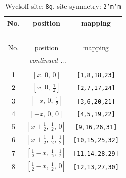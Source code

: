 \documentclass[fleqn,8pt]{jsarticle}
\begin{document}
\begin{longtable}{ccc}
\caption{Wyckoff site: {\tt 8g}, site symmetry: {\tt 2'm'm}}
 \\
 \hline \hline
No. & position & mapping \\ \hline \endfirsthead

\multicolumn{2}{l}{\tablename\ \thetable{}} \\
 \hline \hline
No. & position & mapping \\ \hline \endhead

 \hline \hline
\multicolumn{2}{r}{\footnotesize\it continued ...} \\ \endfoot

 \hline \hline
\multicolumn{2}{r}{} \\ \endlastfoot

1 & $\left[ x,\, 0,\, 0 \right]$ & {\tt [1,8,18,23]} \\ \hline
2 & $\left[ x,\, 0,\, \frac{1}{2} \right]$ & {\tt [2,7,17,24]} \\ \hline
3 & $\left[ - x,\, 0,\, \frac{1}{2} \right]$ & {\tt [3,6,20,21]} \\ \hline
4 & $\left[ - x,\, 0,\, 0 \right]$ & {\tt [4,5,19,22]} \\ \hline
5 & $\left[ x + \frac{1}{2},\, \frac{1}{2},\, 0 \right]$ & {\tt [9,16,26,31]} \\ \hline
6 & $\left[ x + \frac{1}{2},\, \frac{1}{2},\, \frac{1}{2} \right]$ & {\tt [10,15,25,32]} \\ \hline
7 & $\left[ \frac{1}{2} - x,\, \frac{1}{2},\, \frac{1}{2} \right]$ & {\tt [11,14,28,29]} \\ \hline
8 & $\left[ \frac{1}{2} - x,\, \frac{1}{2},\, 0 \right]$ & {\tt [12,13,27,30]} \\
\end{longtable}
\renewcommand{\arraystretch}{1.2}
\end{document}
